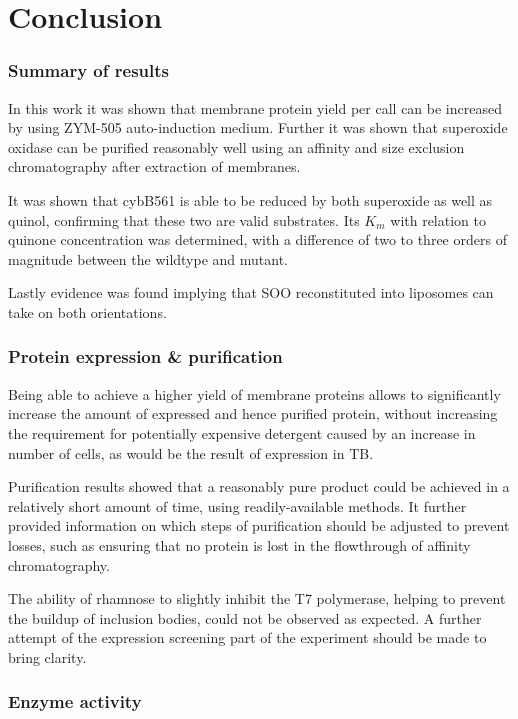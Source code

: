\part{Conclusion}

\section{Summary of results}

In this work it was shown that membrane protein yield per call can be increased
by using ZYM-505 auto-induction medium. Further it was shown that superoxide
oxidase can be purified reasonably well using an affinity and size exclusion
chromatography after extraction of membranes.

It was shown that cybB561 is able to be reduced by both superoxide as well as
quinol, confirming that these two are valid substrates. Its $K_m$ with relation
to quinone concentration was determined, with a difference of two to three
orders of magnitude between the wildtype and mutant.

Lastly evidence was found implying that SOO reconstituted into liposomes can
take on both orientations.

\section{Protein expression \& purification}

Being able to achieve a higher yield of membrane proteins allows to
significantly increase the amount of expressed and hence purified protein,
without increasing the requirement for potentially expensive detergent caused
by an increase in number of cells, as would be the result of expression in
TB.\cite{memstar}

Purification results showed that a reasonably pure product could be achieved in
a relatively short amount of time, using readily-available methods. It further
provided information on which steps of purification should be adjusted to
prevent losses, such as ensuring that no protein is lost in the flowthrough of
affinity chromatography.

The ability of rhamnose to slightly inhibit the T7 polymerase, helping to
prevent the buildup of inclusion bodies, could not be observed as expected. A
further attempt of the expression screening part of the experiment should be
made to bring clarity.
\section{Enzyme activity}

